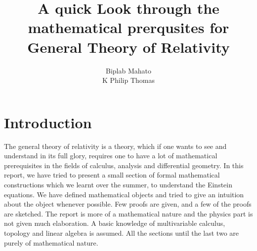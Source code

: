 \documentclass[a4paper]{report}
\theoremstyle{definition}
\theoremstyle{remark}
\begin{document}
	\begin{titlepage}
		\title{A quick Look through the mathematical prerqusites for General Theory of Relativity}
		\author{Biplab Mahato\\K Philip Thomas}
		\date{}
		\maketitle
	\end{titlepage}

	\tableofcontents

	\section{Introduction}
		The general theory of relativity is a theory, which if one wants to see and understand in its full glory, requires one to have a lot of mathematical prerequisites in the fields of calculus, analysis and differential geometry. In this report, we have tried to present a small section of formal mathematical constructions which we learnt over the summer, to understand the Einstein equations. We have defined mathematical objects and tried to give an intuition about the object whenever possible. Few proofs are given, and a few of the proofs are sketched. The report is more of a mathematical nature and the physics part is not given much elaboration. A basic knowledge of multivariable calculus, topology and linear algebra is assumed. All the sections until the last  two are purely of mathematical nature.
\end{document}

